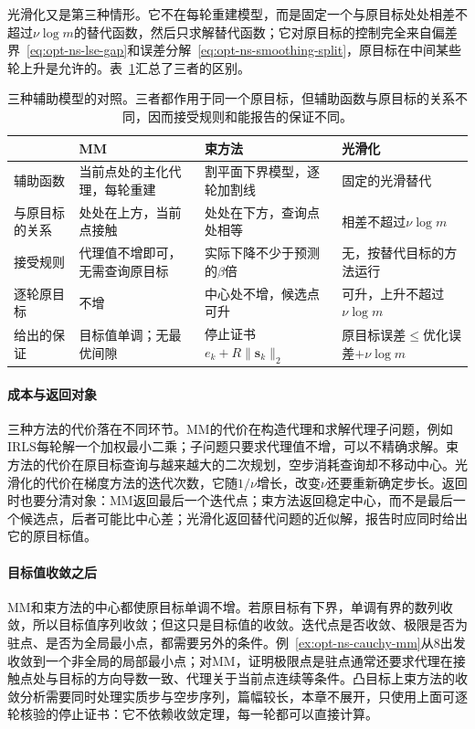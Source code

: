 光滑化又是第三种情形。它不在每轮重建模型，而是固定一个与原目标处处相差不超过$\nu\log m$的替代函数，然后只求解替代函数；它对原目标的控制完全来自偏差界~\eqref{eq:opt-ns-lse-gap}和误差分解~\eqref{eq:opt-ns-smoothing-split}，原目标在中间某些轮上升是允许的。表~\ref{tab:opt-ns-surrogates}汇总了三者的区别。

\begin{table}[!htbp]
  \centering
  \small
  \begin{tabularx}{\linewidth}{@{}l>{\raggedright\arraybackslash}X>{\raggedright\arraybackslash}X>{\raggedright\arraybackslash}X@{}}
    \toprule
     & MM & 束方法 & 光滑化 \\
    \midrule
    辅助函数 & 当前点处的主化代理，每轮重建 & 割平面下界模型，逐轮加割线 & 固定的光滑替代 \\
    与原目标的关系 & 处处在上方，当前点接触 & 处处在下方，查询点处相等 & 相差不超过$\nu\log m$ \\
    接受规则 & 代理值不增即可，无需查询原目标 & 实际下降不少于预测的$\beta$倍 & 无，按替代目标的方法运行 \\
    逐轮原目标 & 不增 & 中心处不增，候选点可升 & 可升，上升不超过$\nu\log m$ \\
    给出的保证 & 目标值单调；无最优间隙 & 停止证书$e_k+R\lVert\bm s_k\rVert_2$ & 原目标误差$\leq$优化误差$+\nu\log m$ \\
    \bottomrule
  \end{tabularx}
  \caption{三种辅助模型的对照。三者都作用于同一个原目标，但辅助函数与原目标的关系不同，因而接受规则和能报告的保证不同。}
  \label{tab:opt-ns-surrogates}
\end{table}

\paragraph{成本与返回对象}
三种方法的代价落在不同环节。MM的代价在构造代理和求解代理子问题，例如IRLS每轮解一个加权最小二乘；子问题只要求代理值不增，可以不精确求解。束方法的代价在原目标查询与越来越大的二次规划，空步消耗查询却不移动中心。光滑化的代价在梯度方法的迭代次数，它随$1/\nu$增长，改变$\nu$还要重新确定步长。返回时也要分清对象：MM返回最后一个迭代点；束方法返回稳定中心，而不是最后一个候选点，后者可能比中心差；光滑化返回替代问题的近似解，报告时应同时给出它的原目标值。

\paragraph{目标值收敛之后}
MM和束方法的中心都使原目标单调不增。若原目标有下界，单调有界的数列收敛，所以目标值序列收敛；但这只是目标值的收敛。迭代点是否收敛、极限是否为驻点、是否为全局最小点，都需要另外的条件。例~\ref{ex:opt-ns-cauchy-mm}从$8$出发收敛到一个非全局的局部最小点；对MM，证明极限点是驻点通常还要求代理在接触点处与目标的方向导数一致、代理关于当前点连续等条件。凸目标上束方法的收敛分析需要同时处理实质步与空步序列，篇幅较长，本章不展开，只使用上面可逐轮核验的停止证书：它不依赖收敛定理，每一轮都可以直接计算。
